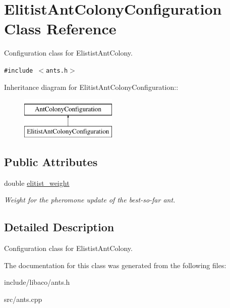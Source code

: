 \hypertarget{classElitistAntColonyConfiguration}{
\section{ElitistAntColonyConfiguration Class Reference}
\label{classElitistAntColonyConfiguration}
}
Configuration class for ElististAntColony.  


{\tt \#include $<$ants.h$>$}

Inheritance diagram for ElitistAntColonyConfiguration::\begin{figure}[H]
\begin{center}
\leavevmode
\includegraphics[height=2cm]{classElitistAntColonyConfiguration}
\end{center}
\end{figure}
\subsection*{Public Attributes}
\begin{CompactItemize}
\item 
\hypertarget{classElitistAntColonyConfiguration_cc7f11b19957d7c1ce6890d5fe632129}{
double \hyperlink{classElitistAntColonyConfiguration_cc7f11b19957d7c1ce6890d5fe632129}{elitist\_\-weight}}
\label{classElitistAntColonyConfiguration_cc7f11b19957d7c1ce6890d5fe632129}

\begin{CompactList}\small\item\em Weight for the pheromone update of the best-so-far ant. \item\end{CompactList}\end{CompactItemize}


\subsection{Detailed Description}
Configuration class for ElististAntColony. 

The documentation for this class was generated from the following files:\begin{CompactItemize}
\item 
include/libaco/ants.h\item 
src/ants.cpp\end{CompactItemize}
